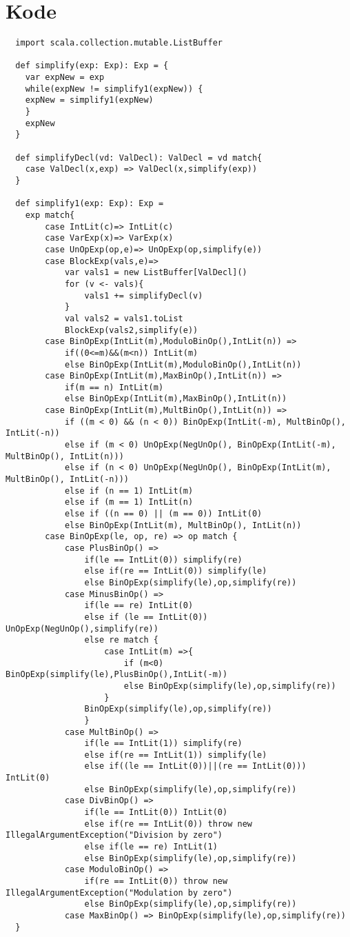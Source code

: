 \documentclass[a4paper, 10pt]{article}
\theoremstyle{remark}
\begin{document}
\section*{Kode}
\begin{lstlisting}
  import scala.collection.mutable.ListBuffer
  
  def simplify(exp: Exp): Exp = {
  	var expNew = exp
	while(expNew != simplify1(expNew)) {
  	expNew = simplify1(expNew)
  	}
  	expNew
  }
  
  def simplifyDecl(vd: ValDecl): ValDecl = vd match{
  	case ValDecl(x,exp) => ValDecl(x,simplify(exp))
  }
  
  def simplify1(exp: Exp): Exp =
  	exp match{
  		case IntLit(c)=> IntLit(c)
  		case VarExp(x)=> VarExp(x)
		case UnOpExp(op,e)=> UnOpExp(op,simplify(e))
		case BlockExp(vals,e)=>
			var vals1 = new ListBuffer[ValDecl]()
  			for (v <- vals){
  				vals1 += simplifyDecl(v)
  			}
  			val vals2 = vals1.toList
  			BlockExp(vals2,simplify(e))
  		case BinOpExp(IntLit(m),ModuloBinOp(),IntLit(n)) =>
  			if((0<=m)&&(m<n)) IntLit(m)
  			else BinOpExp(IntLit(m),ModuloBinOp(),IntLit(n))
  		case BinOpExp(IntLit(m),MaxBinOp(),IntLit(n)) =>
  			if(m == n) IntLit(m)
  			else BinOpExp(IntLit(m),MaxBinOp(),IntLit(n))
  		case BinOpExp(IntLit(m),MultBinOp(),IntLit(n)) =>
  			if ((m < 0) && (n < 0)) BinOpExp(IntLit(-m), MultBinOp(), IntLit(-n))
  			else if (m < 0) UnOpExp(NegUnOp(), BinOpExp(IntLit(-m), MultBinOp(), IntLit(n)))
  			else if (n < 0) UnOpExp(NegUnOp(), BinOpExp(IntLit(m), MultBinOp(), IntLit(-n)))
  			else if (n == 1) IntLit(m)
  			else if (m == 1) IntLit(n)
  			else if ((n == 0) || (m == 0)) IntLit(0)
  			else BinOpExp(IntLit(m), MultBinOp(), IntLit(n))
  		case BinOpExp(le, op, re) => op match {
  			case PlusBinOp() =>
  				if(le == IntLit(0)) simplify(re)
	  			else if(re == IntLit(0)) simplify(le)
  				else BinOpExp(simplify(le),op,simplify(re))
  			case MinusBinOp() =>
  				if(le == re) IntLit(0)
	  			else if (le == IntLit(0)) UnOpExp(NegUnOp(),simplify(re))
  				else re match {
  					case IntLit(m) =>{
  						if (m<0) BinOpExp(simplify(le),PlusBinOp(),IntLit(-m))
  						else BinOpExp(simplify(le),op,simplify(re))
	  				}
  				BinOpExp(simplify(le),op,simplify(re))
  				}
	  		case MultBinOp() =>
  				if(le == IntLit(1)) simplify(re)
  				else if(re == IntLit(1)) simplify(le)
  				else if((le == IntLit(0))||(re == IntLit(0))) IntLit(0)
	  			else BinOpExp(simplify(le),op,simplify(re))
  			case DivBinOp() =>
  				if(le == IntLit(0)) IntLit(0)
  				else if(re == IntLit(0)) throw new IllegalArgumentException("Division by zero")
	  			else if(le == re) IntLit(1)
  				else BinOpExp(simplify(le),op,simplify(re))
  			case ModuloBinOp() =>
  				if(re == IntLit(0)) throw new IllegalArgumentException("Modulation by zero")
  				else BinOpExp(simplify(le),op,simplify(re))
	  		case MaxBinOp() => BinOpExp(simplify(le),op,simplify(re))
  }
\end{lstlisting}
\end{document}
